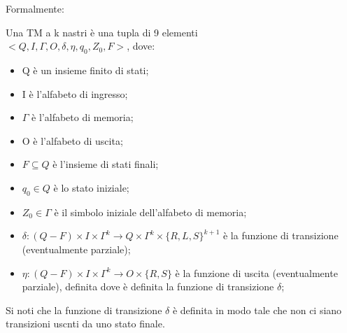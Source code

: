   Formalmente:
  \begin{definition} \label{TM}
    Una TM a k nastri è una tupla di 9 elementi\\  \(<Q, I, \Gamma, O, \delta, \eta, q_0, Z_0, F>\), dove:
    \begin{itemize}
      \item Q è un insieme finito di stati;
      \item I è l'alfabeto di ingresso;
      \item \(\Gamma\) è l'alfabeto di memoria;
      \item O è l'alfabeto di uscita;
      \item \(F \subseteq Q\) è l'insieme di stati finali;
      \item \(q_0 \in Q\) è lo stato iniziale;
      \item \(Z_0\in \Gamma\) è il simbolo iniziale dell'alfabeto di memoria;
      \item \(\delta:(Q-F)\times I\times\Gamma^k\to Q\times\Gamma^k\times\{R,L,S\}^{k+1} \) è la funzione di transizione (eventualmente parziale);
      \item \(\eta:(Q-F)\times I\times \Gamma^k \to O\times\{R,S\}\) è la funzione di uscita (eventualmente parziale), definita dove è definita la funzione di transizione \(\delta\);
    \end{itemize}
  \end{definition}

  Si noti che la funzione di transizione \(\delta\) è definita in modo tale che non ci siano transizioni uscnti da uno stato finale.

